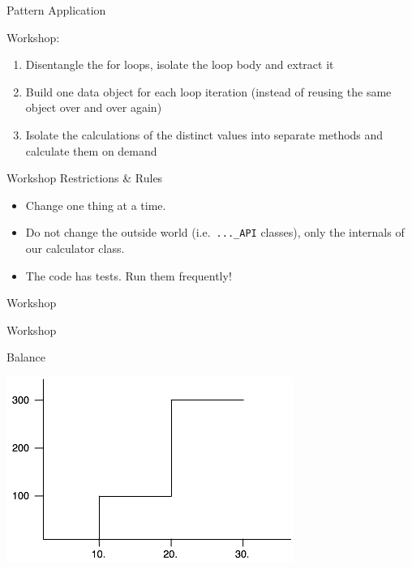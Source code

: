 \begin{frame}[fragile]{Pattern Application}

Workshop:

\begin{enumerate}
\item Disentangle the for loops, isolate the loop body and extract it
\item Build one data object for each loop iteration (instead of reusing the same object over and over again)
\item Isolate the calculations of the distinct values into separate methods and calculate them on demand
\end{enumerate}

\end{frame}



\begin{frame}[fragile]{Workshop Restrictions \& Rules}

\begin{itemize}
\item Change one thing at a time.
\item Do not change the outside world (i.e.~\texttt{...\_API} classes), only the internals of our calculator class.
\item The code has tests. Run them frequently!
\end{itemize}

\end{frame}




\begin{frame}[fragile]{Workshop}

\begin{center}
{\huge Workshop}
\end{center}
\end{frame}

\begin{frame}[fragile]{Balance}
\begin{center}
\includegraphics[width=.85 \paperwidth]{../workshopMaterial/balance.jpg}
\end{center}
\end{frame}


